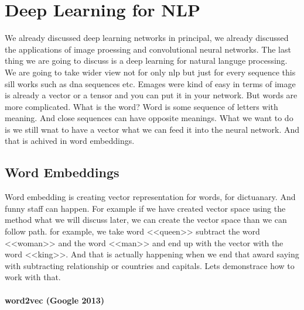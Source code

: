 \chapter{Deep Learning for NLP}

{\sf We already discussed deep learning networks in principal, we already discussed the applications of image proessing and convolutional neural networks. The last thing we are going to discuss is a deep learning for natural languge processing. We are going to take wider view not for only nlp but just for every sequence this sill works such as dna sequences etc. Emages were kind of easy in terms of image is already a vector or a tensor and you can put it in your network. But words are more complicated. What is the word? Word is some sequence of letters with meaning. And close sequences can have opposite meanings. What we want to do is we still wnat to have a vector what we can feed it into the neural network. And that is achived in word embeddings.}

\section{Word Embeddings}

Word embedding is creating vector representation for words, for dictuanary. And funny staff can happen. For example if we have created vector space using the method what we will discuss later, we can create the vector space than we can follow path. for example, we take word <<queen>> subtract the word <<woman>> and the word <<man>> and end up with the vector with the word <<king>>. And that is actually happening when we end that award saying with subtracting relationship or countries and capitals. Lets demonstrace how to work with that.

\subsubsection*{word2vec (Google 2013)}

